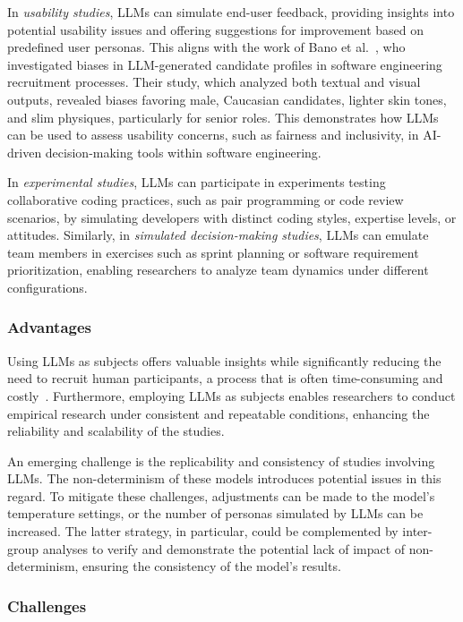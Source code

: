 In \textit{usability studies}, LLMs can simulate end-user feedback, providing insights into potential usability issues and offering suggestions for improvement based on predefined user personas. This aligns with the work of Bano et al.~\cite{bano2025doessoftwareengineerlook}, who investigated biases in LLM-generated candidate profiles in software engineering recruitment processes. Their study, which analyzed both textual and visual outputs, revealed biases favoring male, Caucasian candidates, lighter skin tones, and slim physiques, particularly for senior roles. This demonstrates how LLMs can be used to assess usability concerns, such as fairness and inclusivity, in AI-driven decision-making tools within software engineering.

In \textit{experimental studies}, LLMs can participate in experiments testing collaborative coding practices, such as pair programming or code review scenarios, by simulating developers with distinct coding styles, expertise levels, or attitudes. 
Similarly, in \textit{simulated decision-making studies}, LLMs can emulate team members in exercises such as sprint planning or software requirement prioritization, enabling researchers to analyze team dynamics under different configurations.

\subsubsection{Advantages}

Using LLMs as subjects offers valuable insights while significantly reducing the need to recruit human participants, a process that is often time-consuming and costly~\cite{DBLP:conf/vl/Madampe0HO24}. 
Furthermore, employing LLMs as subjects enables researchers to conduct empirical research under consistent and repeatable conditions, enhancing the reliability and scalability of the studies.

An emerging challenge is the replicability and consistency of studies involving LLMs. The non-determinism of these models introduces potential issues in this regard. To mitigate these challenges, adjustments can be made to the model's temperature settings, or the number of personas simulated by LLMs can be increased. The latter strategy, in particular, could be complemented by inter-group analyses to verify and demonstrate the potential lack of impact of non-determinism, ensuring the consistency of the model's results.

\subsubsection{Challenges}

